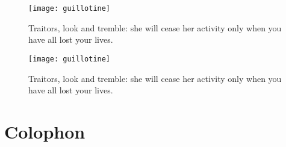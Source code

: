 \documentclass[
paper=5.5in:8.5in,
]{scrbook}
\begin{document}
\frontmatter








\renewcommand*\raggedchapter{\centering}



\tableofcontents
\thispagestyle{plain}
\clearpage


\makeatletter
{}
{%
\begin{figure}[p!]
	\centering
	\texttt{[image: guillotine]}
	\caption{Traitors, look and tremble: she will cease her activity only when you have all lost your lives.}
	\label{guillotine}
\end{figure}
\thispagestyle{empty}
\clearpage

}{%
\vfill
\begin{figure}[p!]
	\centering
	\texttt{[image: guillotine]}
	\caption{Traitors, look and tremble: she will cease her activity only when you have all lost your lives.}
	\label{guillotine}
\end{figure}
\vfill
\thispagestyle{empty}
\clearpage
}
\makeatother



\mainmatter
\renewcommand*{\chapterpagestyle}{plain}


\renewcommand*{\chaptermarkformat}{}


































\chapter*{Colophon}
\end{document}
